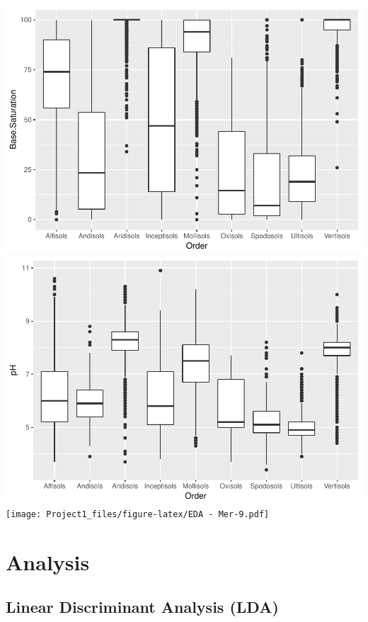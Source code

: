 \documentclass[]{article}
\begin{document}
\includegraphics{Project1_files/figure-latex/EDA - Mer-7.pdf}
\includegraphics{Project1_files/figure-latex/EDA - Mer-8.pdf}
\texttt{[image: Project1\_files/figure-latex/EDA - Mer-9.pdf]}

\section{Analysis}\label{analysis}

\subsection{Linear Discriminant Analysis
(LDA)}\label{linear-discriminant-analysis-lda}
\end{document}
